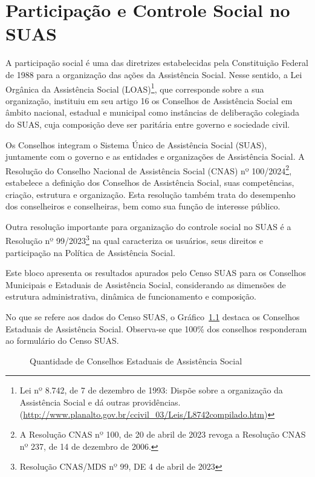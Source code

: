 \documentclass[
  letterpaper,
  DIV=11,
  numbers=noendperiod]{scrreprt}
\begin{document}

\chapter{Participação e Controle Social no
SUAS}\label{participauxe7uxe3o-e-controle-social-no-suas}

A participação social é uma das diretrizes estabelecidas pela
Constituição Federal de 1988 para a organização das ações da Assistência
Social. Nesse sentido, a Lei Orgânica da Assistência Social
(LOAS)\footnote{Lei nº 8.742, de 7 de dezembro de 1993: Dispõe sobre a
  organização da Assistência Social e dá outras providências.
  (\url{http://www.planalto.gov.br/ccivil_03/Leis/L8742compilado.htm})},
que corresponde sobre a sua organização, instituiu em seu artigo 16 os
Conselhos de Assistência Social em âmbito nacional, estadual e municipal
como instâncias de deliberação colegiada do SUAS, cuja composição deve
ser paritária entre governo e sociedade civil.

Os Conselhos integram o Sistema Único de Assistência Social (SUAS),
juntamente com o governo e as entidades e organizações de Assistência
Social. A Resolução do Conselho Nacional de Assistência Social (CNAS) nº
100/2024\footnote{A Resolução CNAS nº 100, de 20 de abril de 2023 revoga
  a Resolução CNAS nº 237, de 14 de dezembro de 2006.}, estabelece a
definição dos Conselhos de Assistência Social, suas competências,
criação, estrutura e organização. Esta resolução também trata do
desempenho dos conselheiros e conselheiras, bem como sua função de
interesse público.

Outra resolução importante para organização do controle social no SUAS é
a Resolução nº 99/2023\footnote{Resolução CNAS/MDS nº 99, DE 4 de abril
  de 2023} na qual caracteriza os usuários, seus direitos e participação
na Política de Assistência Social.

Este bloco apresenta os resultados apurados pelo Censo SUAS para os
Conselhos Municipais e Estaduais de Assistência Social, considerando as
dimensões de estrutura administrativa, dinâmica de funcionamento e
composição.

No que se refere aos dados do Censo SUAS, o Gráfico~\ref{fig-qtd-ceas}
destaca os Conselhos Estaduais de Assistência Social. Observa-se que
100\% dos conselhos responderam ao formulário do Censo SUAS.

\begin{figure}


\caption{\label{fig-qtd-ceas}Quantidade de Conselhos Estaduais de
Assistência Social}

\end{figure}%
\end{document}
